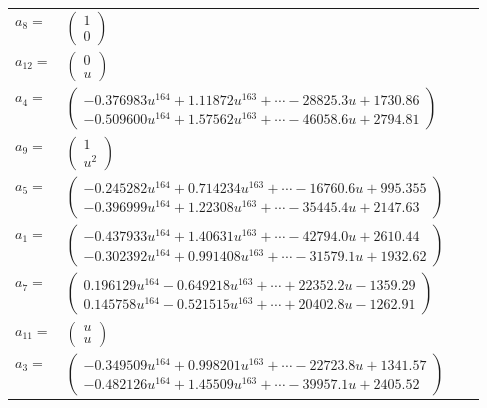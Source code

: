 \documentclass[1p]{elsarticle_modified}
\theoremstyle{definition}
\begin{document}
\begin{tabular}{m{7pt} m{180pt} m{7pt} m{180pt} }
\flushright $a_{8}=$&$\begin{pmatrix}1\\0\end{pmatrix}$ \\
\flushright $a_{12}=$&$\begin{pmatrix}0\\u\end{pmatrix}$ \\
\flushright $a_{4}=$&$\begin{pmatrix}-0.376983 u^{164}+1.11872 u^{163}+\cdots-28825.3 u+1730.86\\-0.509600 u^{164}+1.57562 u^{163}+\cdots-46058.6 u+2794.81\end{pmatrix}$ \\
\flushright $a_{9}=$&$\begin{pmatrix}1\\u^2\end{pmatrix}$ \\
\flushright $a_{5}=$&$\begin{pmatrix}-0.245282 u^{164}+0.714234 u^{163}+\cdots-16760.6 u+995.355\\-0.396999 u^{164}+1.22308 u^{163}+\cdots-35445.4 u+2147.63\end{pmatrix}$ \\
\flushright $a_{1}=$&$\begin{pmatrix}-0.437933 u^{164}+1.40631 u^{163}+\cdots-42794.0 u+2610.44\\-0.302392 u^{164}+0.991408 u^{163}+\cdots-31579.1 u+1932.62\end{pmatrix}$ \\
\flushright $a_{7}=$&$\begin{pmatrix}0.196129 u^{164}-0.649218 u^{163}+\cdots+22352.2 u-1359.29\\0.145758 u^{164}-0.521515 u^{163}+\cdots+20402.8 u-1262.91\end{pmatrix}$ \\
\flushright $a_{11}=$&$\begin{pmatrix}u\\u\end{pmatrix}$ \\
\flushright $a_{3}=$&$\begin{pmatrix}-0.349509 u^{164}+0.998201 u^{163}+\cdots-22723.8 u+1341.57\\-0.482126 u^{164}+1.45509 u^{163}+\cdots-39957.1 u+2405.52\end{pmatrix}$ \\

\end{tabular}
\end{document}

